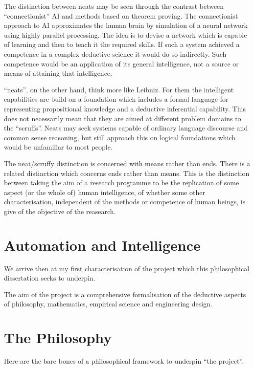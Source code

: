 The distinction between neats may be seen through the contrast between ``connectionist'' AI and methods based on theorem proving.
The connectionist approach to AI approximates the human brain by simulation of a neural network using highly parallel processing.
The idea is to devise a network which is capable of learning and then to teach it the required skills.
If such a system achieved a competence in a complex deductive science it would do so indirectly.
Such competence would be an application of its general intelligence, not a source or means of attaining that intelligence.

``neats'', on the other hand, think more like Leibniz.
For them the intelligent capabilities are build on a foundation which includes a formal language for representing propositional knowledge and a deductive inferential capability.
This does not necessarily mean that they are aimed at different problem domains to the ``scruffs''.
Neats may seek systems capable of ordinary language discourse and common sense reasoning, but still approach this on logical foundations which would be unfamiliar to most people.

The neat/scruffy distinction is concerned with means rather than ends.
There is a related distinction which concerns ends rather than means.
This is the distinction between taking the aim of a research programme to be the replication of some aspect (or the whole of) human intelligence, of whether some other characterisation, independent of the methods or competence of human beings, is give of the objective of the reasearch.

\section{Automation and Intelligence}\label{AutomationAndIntelligence}

We arrive then at my first characterisation of the project which this philosophical dissertation seeks to underpin.

The aim of the project is a comprehensive formalisation of the deductive aspects of philosophy, mathematics, empirical science and engineering design.



\section{The Philosophy}\label{ThePhilosophy}

Here are the bare bones of a philosophical framework to underpin ``the project''.

